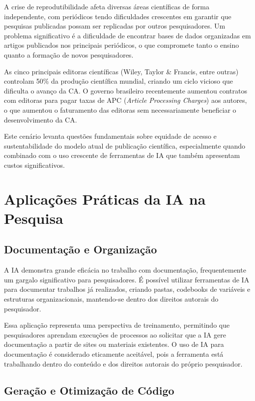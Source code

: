\documentclass[
  a4paper,
]{book}
\begin{document}
A crise de reprodutibilidade afeta diversas áreas científicas de forma
independente, com periódicos tendo dificuldades crescentes em garantir
que pesquisas publicadas possam ser replicadas por outros pesquisadores.
Um problema significativo é a dificuldade de encontrar bases de dados
organizadas em artigos publicados nos principais periódicos, o que
compromete tanto o ensino quanto a formação de novos pesquisadores.

As cinco principais editoras científicas (Wiley, Taylor \& Francis,
entre outras) controlam 50\% da produção científica mundial, criando um
ciclo vicioso que dificulta o avanço da CA. O governo brasileiro
recentemente aumentou contratos com editoras para pagar taxas de APC
(\emph{Article Processing Charges}) aos autores, o que aumentou o
faturamento das editoras sem necessariamente beneficiar o
desenvolvimento da CA.

Este cenário levanta questões fundamentais sobre equidade de acesso e
sustentabilidade do modelo atual de publicação científica, especialmente
quando combinado com o uso crescente de ferramentas de IA que também
apresentam custos significativos.

\section{Aplicações Práticas da IA na
Pesquisa}\label{aplicauxe7uxf5es-pruxe1ticas-da-ia-na-pesquisa}

\subsection{Documentação e
Organização}\label{documentauxe7uxe3o-e-organizauxe7uxe3o}

A IA demonstra grande eficácia no trabalho com documentação,
frequentemente um gargalo significativo para pesquisadores. É possível
utilizar ferramentas de IA para documentar trabalhos já realizados,
criando pastas, codebooks de variáveis e estruturas organizacionais,
mantendo-se dentro dos direitos autorais do pesquisador.

Essa aplicação representa uma perspectiva de treinamento, permitindo que
pesquisadores aprendam execuções de processos ao solicitar que a IA gere
documentação a partir de sites ou materiais existentes. O uso de IA para
documentação é considerado eticamente aceitável, pois a ferramenta está
trabalhando dentro do conteúdo e dos direitos autorais do próprio
pesquisador.

\subsection{Geração e Otimização de
Código}\label{gerauxe7uxe3o-e-otimizauxe7uxe3o-de-cuxf3digo}
\end{document}
